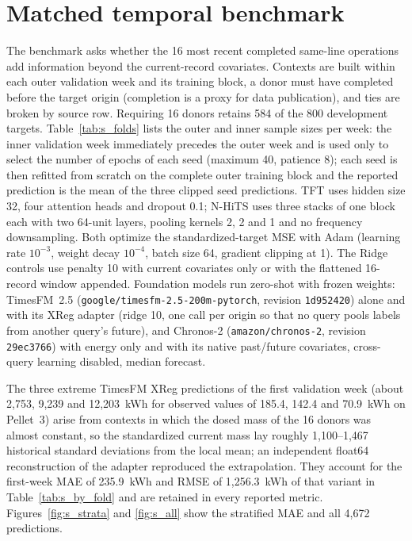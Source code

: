\documentclass[11pt,a4paper]{article}
\begin{document}
\section{Matched temporal benchmark}\label{sec:temporal}
The benchmark asks whether the 16 most recent completed same-line operations add information beyond the current-record covariates. Contexts are built within each outer validation week and its training block, a donor must have completed before the target origin (completion is a proxy for data publication), and ties are broken by source row. Requiring 16 donors retains 584 of the 800 development targets. Table~\ref{tab:s_folds} lists the outer and inner sample sizes per week: the inner validation week immediately precedes the outer week and is used only to select the number of epochs of each seed (maximum 40, patience 8); each seed is then refitted from scratch on the complete outer training block and the reported prediction is the mean of the three clipped seed predictions. TFT uses hidden size 32, four attention heads and dropout 0.1; N-HiTS uses three stacks of one block each with two 64-unit layers, pooling kernels 2, 2 and 1 and no frequency downsampling. Both optimize the standardized-target MSE with Adam (learning rate $10^{-3}$, weight decay $10^{-4}$, batch size 64, gradient clipping at 1). The Ridge controls use penalty 10 with current covariates only or with the flattened 16-record window appended. Foundation models run zero-shot with frozen weights: TimesFM~2.5 (\texttt{google/timesfm-2.5-200m-pytorch}, revision \texttt{1d952420}) alone and with its XReg adapter (ridge 10, one call per origin so that no query pools labels from another query's future), and Chronos-2 (\texttt{amazon/chronos-2}, revision \texttt{29ec3766}) with energy only and with its native past/future covariates, cross-query learning disabled, median forecast.







The three extreme TimesFM XReg predictions of the first validation week (about 2,753, 9,239 and 12,203~kWh for observed values of 185.4, 142.4 and 70.9~kWh on Pellet~3) arise from contexts in which the dosed mass of the 16 donors was almost constant, so the standardized current mass lay roughly 1,100--1,467 historical standard deviations from the local mean; an independent float64 reconstruction of the adapter reproduced the extrapolation. They account for the first-week MAE of 235.9~kWh and RMSE of 1,256.3~kWh of that variant in Table~\ref{tab:s_by_fold} and are retained in every reported metric. Figures~\ref{fig:s_strata} and \ref{fig:s_all} show the stratified MAE and all 4,672 predictions.
\end{document}

